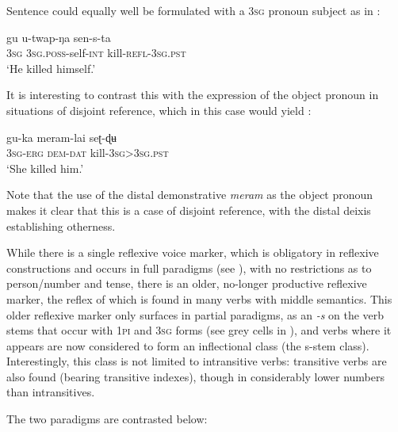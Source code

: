 \documentclass[output=paper]{langscibook}
\begin{document}
Sentence  could equally well be formulated with a 3\textsc{sg} pronoun subject as in :



\ea%
    \label{ex:Lahaussois:10}
    \gll gu u-twap-ŋa sen-s-ta\\
        \textsc{3sg} \textsc{3sg.poss}{}-self-\textsc{int}   kill-\textsc{refl-3sg.pst}\\
    \glt ‘He killed himself.' 
    \z

It is interesting to contrast this with the expression of the object pronoun in situations of disjoint reference, which in this case would yield : 

\ea%
    \label{ex:Lahaussois:11}
    \gll gu-ka meram-lai seʈ-ɖʉ \\
        \textsc{3sg-erg} \textsc{dem-dat} kill-\textsc{3sg>3sg.pst}\\
    \glt ‘She killed him.'  
    \z

Note that the use of the distal demonstrative \textit{meram} as the object pronoun makes it clear that this is a case of disjoint reference, with the distal deixis establishing otherness.


While there is a single reflexive voice marker, which is obligatory in reflexive constructions and occurs in full paradigms (see ), with no restrictions as to person/number and tense, there is an older, no-longer productive reflexive marker, the reflex of which is found in many verbs with middle semantics. This older reflexive marker only surfaces in partial paradigms, as an \textit{{}-s} on the verb stems that occur with 1\textsc{pi} and 3\textsc{sg} forms (see grey cells in ), and verbs where it appears are now considered to form an inflectional class (the s-stem class). Interestingly, this class is not limited to intransitive verbs: transitive verbs are also found (bearing transitive indexes), though in considerably lower numbers than intransitives.

  The two paradigms are contrasted below:
\end{document}
